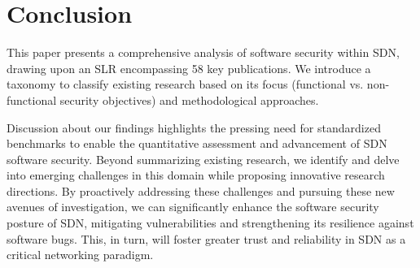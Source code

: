 \section{Conclusion}\label{sec:con}
This paper presents a comprehensive analysis of software security within SDN, drawing upon an SLR encompassing 58 key publications. We introduce a taxonomy to classify existing research based on its focus (functional vs. non-functional security objectives) and methodological approaches.

Discussion about our findings highlights the pressing need for standardized benchmarks to enable the quantitative assessment and advancement of SDN software security. Beyond summarizing existing research, we identify and delve into emerging challenges in this domain while proposing innovative research directions. By proactively addressing these challenges and pursuing these new avenues of investigation, we can significantly enhance the software security posture of SDN, mitigating vulnerabilities and strengthening its resilience against software bugs. This, in turn, will foster greater trust and reliability in SDN as a critical networking paradigm.


